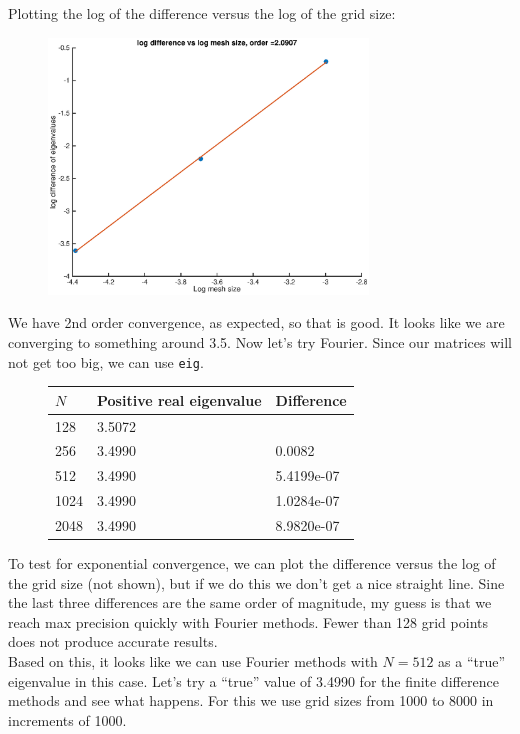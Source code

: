 \documentclass[12pt]{article}
\begin{document}
Plotting the log of the difference versus the log of the grid size:
\begin{figure}[H]
\includegraphics[width=8.5cm]{1double1fdeigdiff}
\end{figure}

We have 2nd order convergence, as expected, so that is good. It looks like we are converging to something around 3.5. Now let's try Fourier. Since our matrices will not get too big, we can use \texttt{eig}.

\begin{figure}[H]
\begin{tabular}{l|ll}
$N$    & Positive real eigenvalue      &  Difference      \\ \hline
  128  &        3.5072  &             \\ 
  256  &        3.4990  &      0.0082      \\ 
  512  &        3.4990  &      5.4199e-07  \\ 
  1024 &        3.4990  &      1.0284e-07  \\
  2048 &        3.4990  &      8.9820e-07  \\ 
\end{tabular}
\end{figure}
To test for exponential convergence, we can plot the difference versus the log of the grid size (not shown), but if we do this we don't get a nice straight line. Sine the last three differences are the same order of magnitude, my guess is that we reach max precision quickly with Fourier methods. Fewer than 128 grid points does not produce accurate results. \\

Based on this, it looks like we can use Fourier methods with $N = 512$ as a ``true'' eigenvalue in this case. Let's try a ``true'' value of 3.4990 for the finite difference methods and see what happens. For this we use grid sizes from 1000 to 8000 in increments of 1000.
\end{document}
